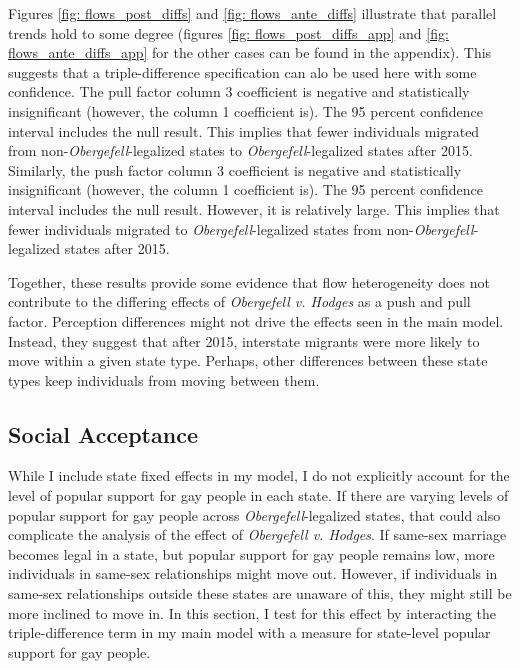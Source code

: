 \documentclass[12pt,letterpaper]{article}
\begin{document}
Figures \ref{fig: flows_post_diffs} and \ref{fig: flows_ante_diffs} illustrate that parallel trends hold to some degree (figures \ref{fig: flows_post_diffs_app} and \ref{fig: flows_ante_diffs_app} for the other cases can be found in the appendix). This suggests that a triple-difference specification can alo be used here with some confidence. The pull factor column 3 coefficient is negative and statistically insignificant (however, the column 1 coefficient is). The 95 percent confidence interval includes the null result. This implies that fewer individuals migrated from non-\textit{Obergefell}-legalized states to \textit{Obergefell}-legalized states after 2015.  Similarly, the push factor column 3 coefficient is negative and statistically insignificant (however, the column 1 coefficient is). The 95 percent confidence interval includes the null result. However, it is relatively large. This implies that fewer individuals migrated to \textit{Obergefell}-legalized states from non-\textit{Obergefell}-legalized states after 2015. 

Together, these results provide some evidence that flow heterogeneity does not contribute to the differing effects of \textit{Obergefell v. Hodges} as a push and pull factor. Perception differences might not drive the effects seen in the main model. Instead, they suggest that after 2015, interstate migrants were more likely to move within a given state type. Perhaps, other differences between these state types keep individuals from moving between them.

\FloatBarrier
\subsection{Social Acceptance}

While I include state fixed effects in my model, I do not explicitly account for the level of popular support for gay people in each state. If there are varying levels of popular support for gay people across \textit{Obergefell}-legalized states, that could also complicate the analysis of the effect of \textit{Obergefell v. Hodges}. If same-sex marriage becomes legal in a state, but popular support for gay people remains low, more individuals in same-sex relationships might move out. However, if individuals in same-sex relationships outside these states are unaware of this, they might still be more inclined to move in. In this section, I test for this effect by interacting the triple-difference term in my main model with a measure for state-level popular support for gay people.
\end{document}
